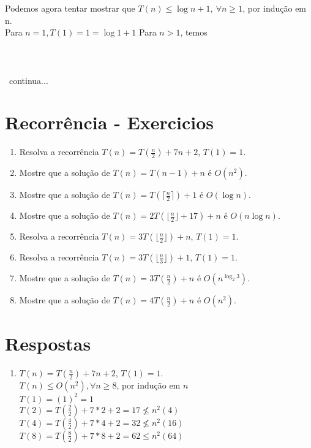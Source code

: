 \documentclass[]{article}
\begin{document}
Podemos agora tentar mostrar que $T(n) \le \log{n} + 1, \ \forall{n} \ge 1$, por indução em n.
\\
Para $n = 1, T(1) = 1 = \log{1} + 1$
Para $n > 1$, temos
\\\\\\\\\
continua...

\section{Recorrência - Exercicios}

\begin{enumerate}
		
		\item Resolva a recorrência $T(n)= T(\frac{n}{2}) + 7n + 2$, $T(1) = 1.$		

		\item Mostre que a solução de $T(n)= T(n - 1) + n$  é $O(n^2).$		

		\item Mostre que a solução de $T(n)= T(\lceil \frac{n}{2} \rceil{}) + 1$  é $O(\log n).$		

		\item Mostre que a solução de $T(n)= 2T(\lfloor \frac{n}{2} \rfloor{} + 17) + n$  é $O(n \log n).$		
	
		\item Resolva a recorrência $T(n)= 3T(\lfloor \frac{n}{2} \rfloor{}) + n$, $T(1) = 1.$		

		\item Resolva a recorrência $T(n)= 3T(\lfloor \frac{n}{3} \rfloor{}) + 1$, $T(1) = 1.$		
		
		\item Mostre que a solução de $T(n)= 3T(\frac{n}{2}) + n$  é $O(n^{\log_{2}{3}}).$	
		
		\item Mostre que a solução de $T(n)= 4T(\frac{n}{2}) + n$  é $O(n^2).$	
		
\end{enumerate}

\section{Respostas}

\begin{enumerate}
	\item  $T(n)= T(\frac{n}{2}) + 7n + 2$, $T(1) = 1.$ \\
	$T(n) \le O(n^2), \forall n \ge 8$, por indução em $n$
	\\
	
	$T(1) = (1)^2 = 1$ \\
	$T(2) = T(\frac{2}{2}) + 7*2 + 2 = 17 \not\le n^2(4) $ \\
	$T(4) = T(\frac{4}{2}) + 7*4 + 2 = 32 \not\le n^2(16) $ \\
	$T(8) = T(\frac{8}{2}) + 7*8 + 2 = 62 \le n^2(64) $ \\
	
	
\end{enumerate}
\end{document}
